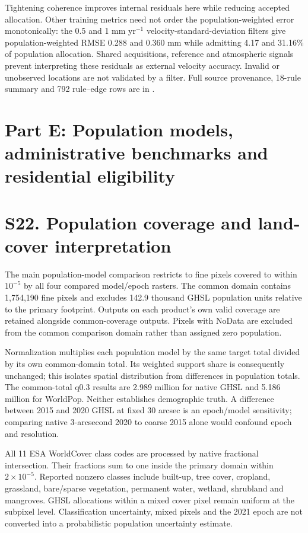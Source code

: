 \documentclass[10pt,a4paper]{article}
\newcommand{\GHSLJointCommon}{2.989}
\newcommand{\WPJointCommon}{5.186}
\newcommand{\JointExcluded}{142.9}
\begin{document}
Tightening coherence improves internal residuals here while reducing accepted allocation. Other training metrics need not order the population-weighted error monotonically: the 0.5 and 1 mm yr$^{-1}$ velocity-standard-deviation filters give population-weighted RMSE 0.288 and 0.360 mm while admitting 4.17 and 31.16\% of population allocation. Shared acquisitions, reference and atmospheric signals prevent interpreting these residuals as external velocity accuracy. Invalid or unobserved locations are not validated by a filter. Full source provenance, 18-rule summary and 792 rule--edge rows are in .




\section*{Part E: Population models, administrative benchmarks and residential eligibility}
\section*{S22. Population coverage and land-cover interpretation}
The main population-model comparison restricts to fine pixels covered to within $10^{-5}$ by all four compared model/epoch rasters. The common domain contains 1,754,190 fine pixels and excludes \JointExcluded{} thousand GHSL population units relative to the primary footprint. Outputs on each product's own valid coverage are retained alongside common-coverage outputs. Pixels with NoData are excluded from the common comparison domain rather than assigned zero population.

Normalization multiplies each population model by the same target total divided by its own common-domain total. Its weighted support share is consequently unchanged; this isolates spatial distribution from differences in population totals. The common-total q0.3 results are \GHSLJointCommon{} million for native GHSL and \WPJointCommon{} million for WorldPop. Neither establishes demographic truth. A difference between 2015 and 2020 GHSL at fixed 30 arcsec is an epoch/model sensitivity; comparing native 3-arcsecond 2020 to coarse 2015 alone would confound epoch and resolution.

All 11 ESA WorldCover class codes are processed by native fractional intersection. Their fractions sum to one inside the primary domain within $2\times10^{-5}$. Reported nonzero classes include built-up, tree cover, cropland, grassland, bare/sparse vegetation, permanent water, wetland, shrubland and mangroves. GHSL allocations within a mixed cover pixel remain uniform at the subpixel level. Classification uncertainty, mixed pixels and the 2021 epoch are not converted into a probabilistic population uncertainty estimate.
\end{document}
